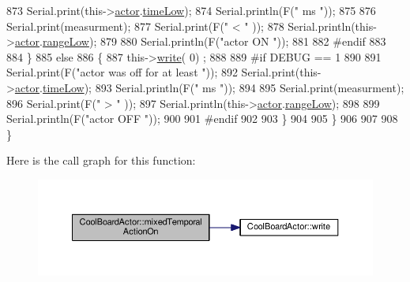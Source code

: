 \begin{DoxyCode}
873             Serial.print(this->\hyperlink{class_cool_board_actor_a8f190db9f7a39fddbcef7f152da970e9}{actor}.\hyperlink{struct_cool_board_actor_1_1state_a314c53c146e8c7b12c025323a34fbb9a}{timeLow});
874             Serial.println(F(\textcolor{stringliteral}{" ms "}));
875 
876             Serial.print(measurment);
877             Serial.print(F(\textcolor{stringliteral}{" < "} ));
878             Serial.println(this->\hyperlink{class_cool_board_actor_a8f190db9f7a39fddbcef7f152da970e9}{actor}.\hyperlink{struct_cool_board_actor_1_1state_a43f891c9fb3bb63575c27cec860de55a}{rangeLow});
879     
880             Serial.println(F(\textcolor{stringliteral}{"actor ON "}));
881     
882 \textcolor{preprocessor}{        #endif  }
883 
884         \}
885         \textcolor{keywordflow}{else} 
886         \{
887             this->\hyperlink{class_cool_board_actor_a958786ff01ea1056ee72c72d439f86da}{write}( 0) ;  
888 
889 \textcolor{preprocessor}{        #if DEBUG == 1 }
890 
891             Serial.print(F(\textcolor{stringliteral}{"actor was off for at least "}));
892             Serial.print(this->\hyperlink{class_cool_board_actor_a8f190db9f7a39fddbcef7f152da970e9}{actor}.\hyperlink{struct_cool_board_actor_1_1state_a314c53c146e8c7b12c025323a34fbb9a}{timeLow});
893             Serial.println(F(\textcolor{stringliteral}{" ms "}));
894 
895             Serial.print(measurment);
896             Serial.print(F(\textcolor{stringliteral}{" > "} ));
897             Serial.println(this->\hyperlink{class_cool_board_actor_a8f190db9f7a39fddbcef7f152da970e9}{actor}.\hyperlink{struct_cool_board_actor_1_1state_a43f891c9fb3bb63575c27cec860de55a}{rangeLow});
898 
899             Serial.println(F(\textcolor{stringliteral}{"actor OFF "}));
900     
901 \textcolor{preprocessor}{        #endif              }
902 
903         \}
904 
905     \}
906 
907     
908 \}
\end{DoxyCode}
Here is the call graph for this function\+:\nopagebreak
\begin{figure}[H]
\begin{center}
\leavevmode
\includegraphics[width=350pt]{dc/d69/class_cool_board_actor_a216aa7a0cfd1f31d0025cc91c2ecd5dd_cgraph}
\end{center}
\end{figure}
